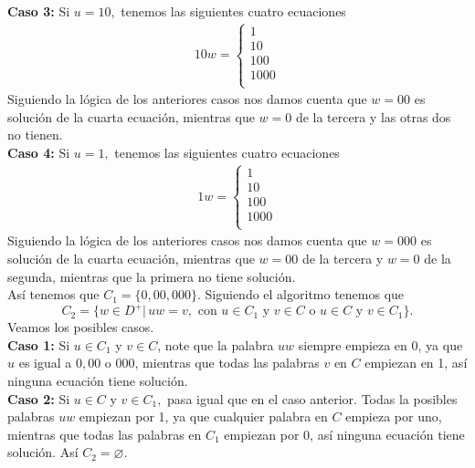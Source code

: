 \begin{sols}
\begin{itemize}
        \textbf{Caso 3:} Si $u=10,$ tenemos las siguientes cuatro ecuaciones
        \begin{align*}
            10w=\begin{cases}
                1\\
                10\\
                100\\
                1000\\
            \end{cases}
        \end{align*}
        Siguiendo la lógica de los anteriores casos nos damos cuenta que $w=00$ es solución de la cuarta ecuación, mientras que $w=0$ de la tercera y las otras dos no tienen.\\

    \textbf{Caso 4:} Si $u=1,$ tenemos las siguientes cuatro ecuaciones
        \begin{align*}
            1w=\begin{cases}
                1\\
                10\\
                100\\
                1000\\
            \end{cases}
        \end{align*}
        Siguiendo la lógica de los anteriores casos nos damos cuenta que $w=000$ es solución de la cuarta ecuación, mientras que $w=00$ de la tercera y $w=0$ de la segunda, mientras que la primera no tiene solución.\\

        Así tenemos que $C_1=\{0,00,000\}.$ Siguiendo el algoritmo tenemos que 
        $$C_2=\{w\in D^+|\,uw=v, \text{ con } u\in C_1 \text{ y } v\in C \text{ o } u\in C \text{ y } v\in C_1 \}.$$
        Veamos los posibles casos.\\

        \textbf{Caso 1:} Si $u\in C_1$ y $v\in C$, note que la palabra $uw$ siempre empieza en $0$, ya que $u$ es igual a $0,00$ o $000$, mientras que todas las palabras $v$ en $C$ empiezan en 1, así ninguna ecuación tiene solución.\\

        \textbf{Caso 2:} Si $u\in C$ y $v\in C_1,$ pasa igual que en el caso anterior. Todas la posibles palabras $uw$ empiezan por 1, ya que cualquier palabra en $C$ empieza por uno, mientras que todas las palabras en $C_1$ empiezan por 0, así ninguna ecuación tiene solución. Así $C_2=\varnothing.$\\


\end{itemize}
\end{sols}

